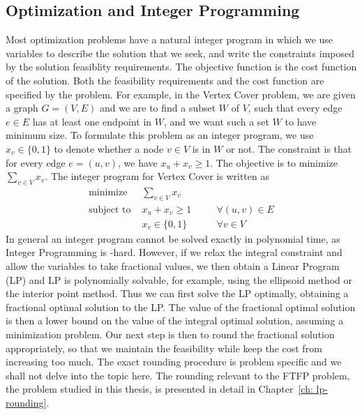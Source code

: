 \documentclass[oneside,final]{ucr}
\begin{document}
\subsection{Optimization and Integer Programming}
\label{subsec: Optimization_IP}
Most optimization problems have a natural integer program in
which we use variables to describe the solution that we
seek, and write the constraints imposed by the solution
feasiblity requirements. The objective function is the cost
function of the solution. Both the feasibility requirements
and the cost function are specified by the problem. For
example, in the Vertex Cover problem, we are given a graph
$G=(V,E)$ and we are to find a subset $W$ of $V$, such that
every edge $e\in E$ has at least one endpoint in $W$, and we
want such a set $W$ to have minimum size. To formulate this
problem as an integer program, we use $x_v \in \{0,1\}$ to
denote whether a node $v\in V$ is in $W$ or not. The
constraint is that for every edge $e=(u,v)$, we have $x_u +
x_v \geq 1$. The objective is to minimize $\sum_{v\in V}
x_v$. The integer program for Vertex Cover is written as
\begin{align*}
  \text{minimize } &\sum_{v\in V} x_v &\\
  \text{subject to }& x_u + x_v \geq 1 &\quad &\forall (u,v) \in
  E\\
  &x_v \in \{0, 1\} &\quad &\forall v \in V
\end{align*}
In general an integer program cannot be solved exactly in
polynomial time, as Integer Programming is
{\NP}-hard. However, if we relax the integral constraint and
allow the variables to take fractional values, we then
obtain a Linear Program (LP) and LP is polynomially
solvable, for example, using the ellipsoid method or the
interior point method. Thus we can first solve the LP
optimally, obtaining a fractional optimal solution to the
LP. The value of the fractional optimal solution is then a
lower bound on the value of the integral optimal solution,
assuming a minimization problem. Our next step is then to
round the fractional solution appropriately, so that we
maintain the feasibility while keep the cost from increasing
too much. The exact rounding procedure is problem specific
and we shall not delve into the topic here. The rounding
relevant to the FTFP problem, the problem studied in this
thesis, is presented in detail in Chapter~\ref{ch:
  lp-rounding}.
\end{document}
